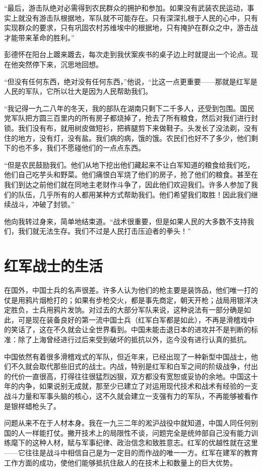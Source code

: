 \documentclass[10pt]{book}
\begin{document}
“最后，游击队绝对必需得到农民群众的拥护和参加。如果没有武装农民运动，事实上就没有游击队根据地，军队就不可能存在。只有深深扎根于人民的心中，只有实现群众的要求，只有巩固农村苏维埃中的根据地，只有掩护在群众之中，游击战才能带来革命的胜利。”

彭德怀在阳台上踱来踱去，每次走到我伏案疾书的桌子边上时就提出一个论点。现在他突然停下来，沉思地回想。

“但没有任何东西，绝对没有任何东西，”他说，“比这一点更重要——那就是红军是人民的军队，它所以壮大是因为人民帮助我们。

“我记得一九二八年的冬天，我的部队在湖南只剩下二千多人，还受到包围。国民党军队把方圆三百里内的所有房子都烧掉了，抢去了所有粮食，然后对我们进行封锁。我们没有布，就用树皮做短衫，把裤腿剪下来做鞋子。头发长了没法剃，没有住的地方，没有灯，没有盐。我们病的病，饿的饿。农民们也好不了多少，他们剩下的也不多，我们不愿碰他们的一点点东西。

“但是农民鼓励我们。他们从地下挖出他们藏起来不让白军知道的粮食给我们吃，他们自己吃芋头和野菜。他们痛恨白军烧了他们的房子，抢了他们的粮食。甚至在我们到达之前他们就在同地主老财作斗争了，因此他们欢迎我们。许多人参加了我们的队伍，几乎所有的人都用某种方式帮助我们。他们希望我们取胜！因此我们继续战斗，冲破了封锁。”

他向我转过身来，简单地结束道。“战术很重要，但是如果人民的大多数不支持我们，我们就无法生存。我们不过是人民打击压迫者的拳头！”

\section{红军战士的生活}

在国外，中国士兵的名声很差。许多人认为他们的枪主要是装饰品，他们唯一打的仗是用鸦片烟枪打的；如果有步枪交火，都是事先商定，朝天开枪；战局用银洋决定胜负，士兵用鸦片发饷。对过去的大部分军队来说，这种说法有一部分确是如此，可是现在装备良好的第一流中国士兵（红军白军都是如此），不再是滑稽戏中的笑话了，这在不久就会让全世界看到。中国未能击退日本的进攻并不是判断的标准：除了上海曾经进行过后来受到破坏的抵抗以外，迄今没有进行认真的抵抗。

中国依然有着很多滑稽戏式的军队，但近年来，已经出现了一种新型中国战士，他们不久就会取代那些旧式的战士。内战，特别是红军和白军之间的阶级战争，付出的代价一直很高，打得往往很猛烈凶狠，双方都没有宽恕或妥协的余地。中国这十年的内争，如果说别无成就，那至少已建立了对运用现代技术和战术有经验的一支战斗力量和军事头脑的核心，这不久就会建立一支强有力的军队，不再能够被看作是银样蜡枪头了。

问题从来不在于人材本身。我在一九三二年的淞沪战役中就知道，中国人同任何别国的人一样能打仗。撇开技术上的局限性不谈，问题完全是统帅部自己没有能力训练麾下的这种人材，赋与军事纪律、政治信念和致胜意志。红军的优越性就在这里——它往往是战斗中相信自己是为一定目的而作战的唯一一方。红军在建军的教育工作方面的成功，使他们能够抵抗住敌人的在技术上和数量上的巨大优势。
\end{document}
